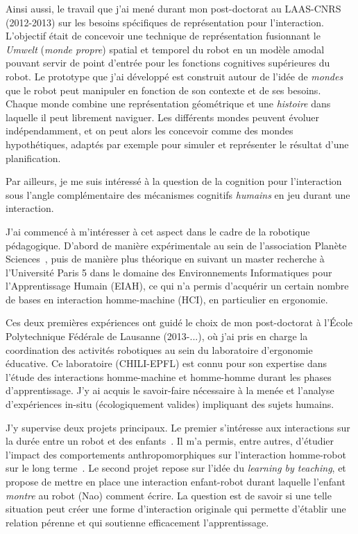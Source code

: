 \documentclass[a4paper]{article}
\begin{document}
Ainsi aussi, le travail que j'ai mené durant mon post-doctorat au LAAS-CNRS
(2012-2013) sur les besoins spécifiques de représentation pour l'interaction.
L'objectif était de concevoir une technique de représentation fusionnant le
\emph{Umwelt} (\emph{monde propre}) spatial et temporel du robot en un modèle
amodal pouvant servir de point d'entrée pour les fonctions cognitives
supérieures du robot. Le prototype que j'ai développé est construit autour de
l'idée de \emph{mondes} que le robot peut manipuler en fonction de son contexte
et de ses besoins.  Chaque monde combine une représentation géométrique et une
\emph{histoire} dans laquelle il peut librement naviguer. Les différents mondes
peuvent évoluer indépendamment, et on peut alors les concevoir comme des mondes
hypothétiques, adaptés par exemple pour simuler et représenter le résultat d'une
planification.

Par ailleurs, je me suis intéressé à la question de la cognition pour
l'interaction sous l'angle complémentaire des mécanismes cognitifs
\emph{humains} en jeu durant une interaction.

J'ai commencé à m'intéresser à cet aspect dans le cadre de la robotique
pédagogique. D'abord de manière expérimentale au sein de l'association Planète
Sciences~\cite{stinckwich2007squeakbot}, puis de manière plus théorique en
suivant un master recherche à l'Université Paris 5 dans le domaine des
Environnements Informatiques pour l'Apprentissage Humain (EIAH), ce qui n'a permis
d'acquérir un certain nombre de bases en interaction homme-machine (HCI), en
particulier en ergonomie.

Ces deux premières expériences ont guidé le choix de mon post-doctorat à l'École
Polytechnique Fédérale de Lausanne (2013-...), où j'ai pris en charge la
coordination des activités robotiques au sein du laboratoire d'ergonomie
éducative. Ce laboratoire (CHILI-EPFL) est connu pour son expertise dans l'étude
des interactions homme-machine et homme-homme durant les phases d'apprentissage.
J'y ai acquis le savoir-faire nécessaire à la menée et l'analyse d'expériences
in-situ (écologiquement valides) impliquant des sujets humains.

J'y supervise deux projets principaux. Le premier s'intéresse aux interactions
sur la durée entre un robot et des enfants~\cite{fink2014which}. Il m'a
permis, entre autres, d'étudier l'impact des comportements anthropomorphiques
sur l'interaction homme-robot sur le long terme~\cite{lemaignan2014dynamics}. Le
second projet repose sur l'idée du \emph{learning by teaching}, et propose de
mettre en place une interaction enfant-robot durant laquelle l'enfant
\emph{montre} au robot (Nao) comment écrire. La question est de savoir si
une telle situation peut créer une forme d'interaction originale qui permette
d'établir une relation pérenne et qui soutienne efficacement l'apprentissage.
\end{document}
